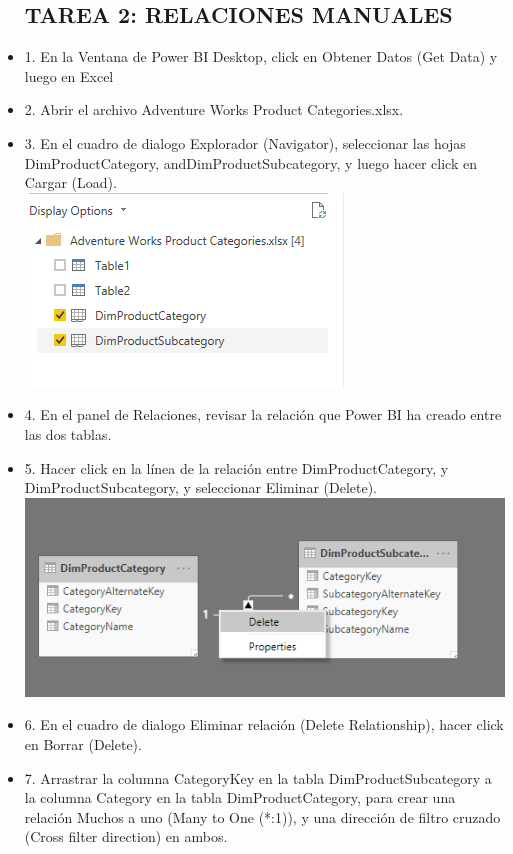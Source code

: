 \begin{itemize}
\subsection {TAREA 2:  RELACIONES MANUALES}
\item 1. En la Ventana de Power BI Desktop, click en Obtener Datos (Get Data) y luego en Excel
\item 2. Abrir el archivo Adventure Works Product Categories.xlsx.
\item 3. En el cuadro de dialogo Explorador (Navigator), seleccionar las hojas DimProductCategory, andDimProductSubcategory, y luego hacer click en Cargar (Load).\\
\includegraphics[scale=0.5]{./Imagenes/image012}
\item 4. En el panel de Relaciones, revisar la relación que Power BI ha creado entre las dos tablas.
\item 5. Hacer click en la línea de la relación entre DimProductCategory, y DimProductSubcategory, y seleccionar Eliminar (Delete). \\
\includegraphics[scale=0.5]{./Imagenes/image013}
\item 6. En el cuadro de dialogo Eliminar relación (Delete Relationship), hacer click en Borrar (Delete).
\item7. Arrastrar la columna CategoryKey en la tabla DimProductSubcategory a la columna Category en la tabla DimProductCategory, para crear una relación Muchos a uno (Many to One (*:1)), y una dirección de filtro cruzado (Cross filter direction) en ambos.

\end{itemize}
